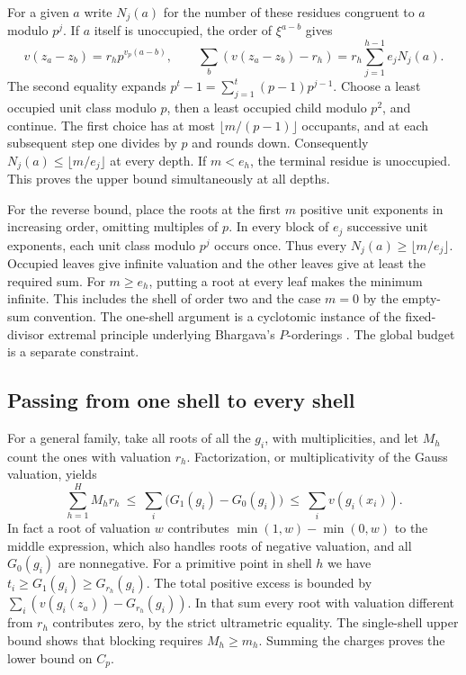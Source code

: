 For a given $a$ write $N_j(a)$ for the number of these residues congruent to $a$
modulo $p^j$. If $a$ itself is unoccupied, the order of $\xi^{a-b}$ gives
\[
 v(z_a-z_b)=r_h p^{v_p(a-b)},\qquad
 \sum_b(v(z_a-z_b)-r_h)=r_h\sum_{j=1}^{h-1} e_j N_j(a).
\]
The second equality expands $p^t-1=\sum_{j=1}^t(p-1)p^{j-1}$.
Choose a least occupied unit class modulo $p$, then a least occupied child
modulo $p^2$, and continue. The first choice has at most $\lfloor m/(p-1)\rfloor$
occupants, and at each subsequent step one divides by $p$ and rounds down.
Consequently $N_j(a)\le\lfloor m/e_j\rfloor$ at every depth. If $m<e_h$, the
terminal residue is unoccupied. This proves the upper bound simultaneously at
all depths.

For the reverse bound, place the roots at the first $m$ positive unit exponents
in increasing order, omitting multiples of $p$. In every block of $e_j$
successive unit exponents, each unit class modulo $p^j$ occurs once. Thus every
$N_j(a)\ge\lfloor m/e_j\rfloor$. Occupied leaves give infinite valuation and
the other leaves give at least the required sum. For $m\ge e_h$, putting a root
at every leaf makes the minimum infinite. This includes the shell of order two
and the case $m=0$ by the empty-sum convention. The one-shell argument is a
cyclotomic instance of the fixed-divisor extremal principle underlying
Bhargava's $P$-orderings \cite{bhargava}. The global budget is a separate constraint.

\subsection*{Passing from one shell to every shell}
For a general family, take all roots of all the $g_i$, with multiplicities, and
let $M_h$ count the ones with valuation $r_h$. Factorization, or
multiplicativity of the Gauss valuation, yields
\[
 \sum_{h=1}^H M_h r_h\ \le\ \sum_i\big(G_1(g_i)-G_0(g_i)\big)
 \ \le\ \sum_i v(g_i(x_i)).
\]
In fact a root of valuation $w$ contributes $\min(1,w)-\min(0,w)$ to the
middle expression, which also handles roots of negative valuation, and
all $G_0(g_i)$ are nonnegative. For a primitive point in shell $h$ we have
$t_i\ge G_1(g_i)\ge G_{r_h}(g_i)$. The total positive excess is bounded by
$\sum_i (v(g_i(z_a))-G_{r_h}(g_i))$. In that sum every root with valuation
different from $r_h$ contributes zero, by the strict ultrametric equality.
The single-shell upper bound shows that blocking requires $M_h\ge m_h$.
Summing the charges proves the lower bound on $C_p$.

